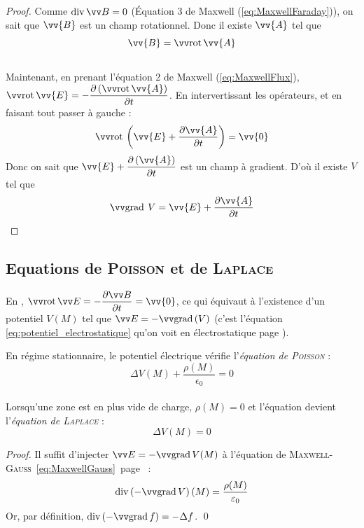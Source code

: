 \documentclass[11pt,a4paper,fleqn,pdftex]{report}
\begin{document}
\begin{proof}
Comme $\diverg \B{} = 0$ (Équation 3 de Maxwell (\ref{eq:MaxwellFaraday})), on sait que $\vv{B}$ est un champ rotationnel. Donc il existe $\vv{A}$ tel que $$\vv{B} = \rot \vv{A}$$\\
Maintenant, en prenant l'équation 2 de Maxwell (\ref{eq:MaxwellFlux}), $\rot \vv{E}=-\dfrac{\partial \left( \rot \vv{A} \right)}{\partial t}$. En intervertissant les opérateurs, et en faisant tout passer à gauche : $$\rot \left( \vv{E} + \dfrac{\partial \vv{A}}{\partial t} \right)=\vv{0}$$ Donc on sait que $\vv{E} + \dfrac{\partial \left( \vv{A} \right)}{\partial t}$ est un champ à gradient. D'où il existe $V$ tel que $$\grad \: V = \vv{E} + \dfrac{\partial \vv{A}}{\partial t}$$
\end{proof}
\subsection{Equations de \textsc{Poisson} et de \textsc{Laplace}}
En , $\rot \E = -\dfrac{\partial \B}{\partial t} = \vv{0}$, ce qui équivaut à l'existence d'un potentiel $V(M)$ tel que $\E = -\grad[V]$ (c'est l'équation \eqref{eq:potentiel_electrostatique} qu'on voit en électrostatique page \pageref{eq:potentiel_electrostatique}). 
\needspace{7cm}
\begin{itheorem}
   En régime stationnaire, le potentiel électrique vérifie l'\emph{équation de \textsc{Poisson}} :
   \begin{equation}
   \Delta V(M) + \dfrac{\rho (M)}{\epsilon_0} = 0
   \end{equation}
   \\
   Lorsqu'une zone est en plus vide de charge, $\rho (M) =0$ et l'équation devient l'\emph{équation de \textsc{Laplace}} : 
   \begin{equation}
   \Delta V(M) = 0
   \end{equation}
\end{itheorem}
\begin{proof}
   Il suffit d'injecter $\E = -\grad V (M)$ à l'équation de \textsc{Maxwell}-\textsc{Gauss}~\eqref{eq:MaxwellGauss}~page~\pageref{eq:MaxwellGauss} : 
   \begin{equation}
   \diverg[-\grad V](M) = \dfrac{\rho (M)}{\epsilon_0}
   \end{equation}
   Or, par définition, $\diverg[-\grad f] = -\Delta f$. \qed
\end{proof}
\end{document}
